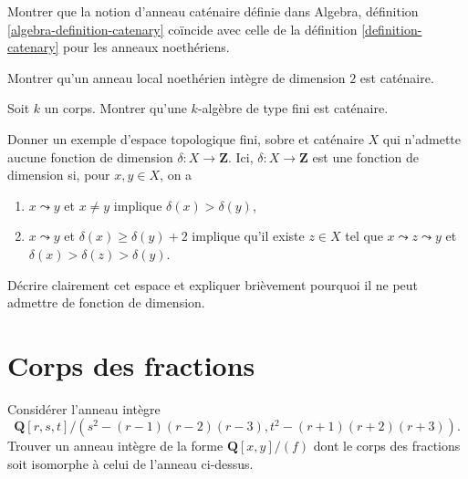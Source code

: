 \begin{exercise}
\label{exercise-catenary-the-same}
Montrer que la notion d'anneau caténaire définie dans
Algebra, définition \ref{algebra-definition-catenary}
coïncide avec celle de la définition \ref{definition-catenary}
pour les anneaux noethériens.
\end{exercise}

\begin{exercise}
\label{exercise-Noetherian-local-domain-dim-2-catenary}
Montrer qu'un anneau local noethérien intègre de dimension $2$ est caténaire.
\end{exercise}

\begin{exercise}
\label{exercise-finite-type-over-field-catenary}
Soit $k$ un corps.
Montrer qu'une $k$-algèbre de type fini est caténaire.
\end{exercise}

\begin{exercise}
\label{exercise-example-no-dim-function}
Donner un exemple d'espace topologique fini, sobre et caténaire
$X$ qui n'admette aucune fonction de dimension $\delta : X \to \mathbf{Z}$.
Ici, $\delta : X \to \mathbf{Z}$ est une fonction de dimension si,
pour $x, y \in X$, on a
\begin{enumerate}
\item $x \leadsto y$ et $x \not = y$ implique $\delta(x) > \delta(y)$,
\item $x \leadsto y$ et $\delta(x) \geq \delta(y) + 2$ implique
qu'il existe $z \in X$ tel que $x \leadsto z \leadsto y$ et
$\delta(x) > \delta(z) > \delta(y)$.
\end{enumerate}
Décrire clairement cet espace et expliquer brièvement pourquoi il
ne peut admettre de fonction de dimension.
\end{exercise}




\section{Corps des fractions}
\label{section-fraction-fields}

\begin{exercise}
\label{exercise-find-fraction-field}
Considérer l'anneau intègre
$$
{\mathbf Q}[r, s, t]/(s^2-(r-1)(r-2)(r-3), t^2-(r + 1)(r + 2)(r + 3)).
$$
Trouver un anneau intègre de la forme ${\mathbf Q}[x, y]/(f)$ dont le
corps des fractions soit isomorphe à celui de l'anneau ci-dessus.
\end{exercise}



